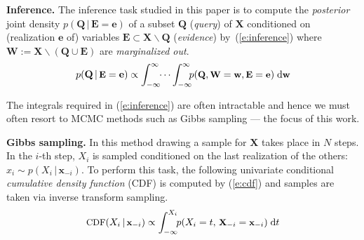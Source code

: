 \documentclass[letterpaper]{article}
\renewcommand{\vec}[1]{\mathbf{#1}}
\newcommand{\bvec}[1]{\textbf{#1}}
\newcommand{\pr}{p}
\newcommand{\dd}{\;\mathrm{d}} %
\begin{document}

\noindent
{\bf Inference.} The inference task studied in this paper is to compute the \emph{posterior} joint density 
$\pr(\bvec{Q} \,|\, \bvec{E}=\bvec{e})$
of 
a subset $\bvec{Q}$ (\emph{query}) of $\bvec{X}$ 
conditioned on (realization $\bvec{e}$ of) 
variables  
$\bvec{E} \subset\bvec{X} \backslash \bvec{Q}$ (\emph{evidence}) by~(\ref{e:inference})  
where $\bvec{W} := \vec{X} \backslash (\vec{Q} \cup \vec{E})$ are \emph{marginalized out}.
\begin{equation}\vspace{-0.5mm}\footnotesize
\label{e:inference}
\pr(\vec{Q} \,|\, \bvec{E} =\vec{e}) \propto 
\int_{-\infty}^{\infty} \!\! \cdots \int_{-\infty}^{\infty}
\!\!\! \pr(\bvec{Q}, \bvec{W} = \bvec{w}, \bvec{E}=\bvec{e} )
 \dd \bvec{w}
\end{equation}


The integrals required in 
(\ref{e:inference}) 
are often intractable and hence we must often resort to MCMC methods
such as Gibbs sampling \cite{geman1984stochastic} --- the focus of this work.

\noindent
{\bf Gibbs sampling.}
 In this method drawing a sample for $\bvec{X}$ takes place in $N$ steps.
In the $i$-th step, $X_i$ is sampled conditioned on the last realization of the others:
$x_i \sim \pr(X_i \,|\, \bvec{x}_{-i})$. 
To perform this task, the following univariate conditional \emph{cumulative density function} (CDF)
is computed by (\ref{e:cdf}) and samples are taken via inverse transform sampling. 
\begin{equation} \footnotesize
\label{e:cdf}
\text{CDF}(X_i  \,|\, \bvec{x}_{-i}) 
\propto
\int_{-\infty}^{X_i} \!\! \pr(X_i = t, \,\bvec{X}_{-i} = \bvec{x}_{-i})  \dd  t
\end{equation} 
\end{document}
